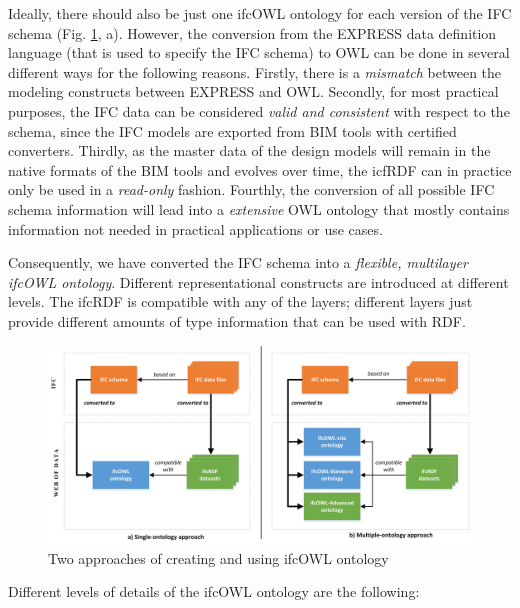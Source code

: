 Ideally, there should also be just one ifcOWL ontology for each version of the IFC schema (Fig. \ref{fig:ifcOWL-layers}, a). However, the conversion from the EXPRESS data definition language (that is used to specify the IFC schema) to OWL can be done in several different ways for the following reasons. Firstly, there is a \emph{mismatch} between the modeling constructs between EXPRESS and OWL. Secondly, for most practical purposes, the IFC data can be considered \emph{valid and consistent} with respect to the schema, since the IFC models are exported from BIM tools with certified converters. Thirdly, as the master data of the design models will remain in the native formats of the BIM tools and evolves over time, the icfRDF can in practice only be used in a \emph{read-only} fashion. Fourthly, the conversion of all possible IFC schema information will lead into a \emph{extensive} OWL ontology that mostly contains information not needed in practical applications or use cases.

Consequently, we have converted the IFC schema into a \emph{flexible, multilayer ifcOWL ontology}. Different representational constructs are introduced at different levels. The ifcRDF is compatible with any of the layers; different layers just provide different amounts of type information that can be used with RDF. 

\begin{figure}[h]
\centering
\includegraphics{images/ifcOWL-approaches.jpg}
\caption{Two approaches of creating and using ifcOWL ontology}
\label{fig:ifcOWL-layers}
\end{figure}

Different levels of details of the ifcOWL ontology are the following:

